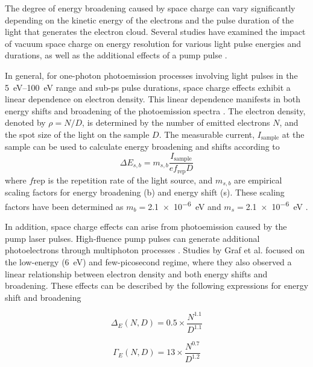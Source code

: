 The degree of energy broadening caused by space charge can vary significantly depending on the kinetic energy of the electrons and the pulse duration of the light that generates the electron cloud.
Several studies have examined the impact of vacuum space charge on energy resolution for various light pulse energies and durations, as well as the additional effects of a pump pulse \cite{corder_ultrafast_2018,plotzing_spin-resolved_2016,hellmann_vacuum_2009,graf_vacuum_2010,frietsch_high-order_2013}.

In general, for one-photon photoemission processes involving light pulses in the \qtyrange{5}{100}{\electronvolt} range and sub-\unit{\pico\second} pulse durations, space charge effects exhibit a linear dependence on electron density.
This linear dependence manifests in both energy shifts and broadening of the photoemission spectra \cite{corder_ultrafast_2018,plotzing_spin-resolved_2016}.
The electron density, denoted by $\rho = N/D$, is determined by the number of emitted electrons $N$, and the spot size of the light on the sample $D$.
The measurable current, $I_\text{sample}$ at the sample can be used to calculate energy broadening and shifts according to
\begin{equation}
	\Delta E_{s,b} = m_{s,b} \frac{I_\text{sample}}{e f_\text{rep} D}
	\label{eq:spacecharge}
\end{equation}
where $f\text{rep}$ is the repetition rate of the light source, and $m_{s,b}$ are empirical scaling factors for energy broadening (b) and energy shift (s). These scaling factors have been determined as $m_b=$\qty{2.1e-6}{\electronvolt} and $m_s=$\qty{2.1e-6}{\electronvolt} \cite{plotzing_spin-resolved_2016}.

In addition, space charge effects can arise from photoemission caused by the pump laser pulses.
High-fluence pump pulses can generate additional photoelectrons through multiphoton processes \cite{al-obaidi_ultrafast_2015}.
Studies by Graf et al. \cite{graf_vacuum_2010} focused on the low-energy (\qty{6}{\electronvolt}) and few-picosecond regime, where they also observed a linear relationship between electron density and both energy shifts and broadening.
These effects can be described by the following expressions for energy shift and broadening

\noindent\begin{minipage}{.5\linewidth}
	\begin{equation}
		\Delta_E(N,D)=0.5\times \frac{N^{1.1}}{D^{1.1}}
	\end{equation}
\end{minipage}%
\begin{minipage}{.5\linewidth}
	\begin{equation}
		\Gamma_E(N,D)=13\times \frac{N^{0.7}}{D^{1.2}}
	\end{equation}
\end{minipage}

